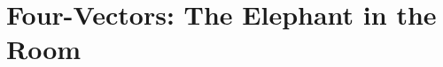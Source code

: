 \documentclass[12pt]{article}
\renewcommand{\vv}[1]{\mathbf{#1}}
\newcommand{\dd}[1]{\mathrm{d}#1}
\begin{document}
\section{Four-Vectors: The Elephant in the Room}
%
%
%
%
\end{document}
